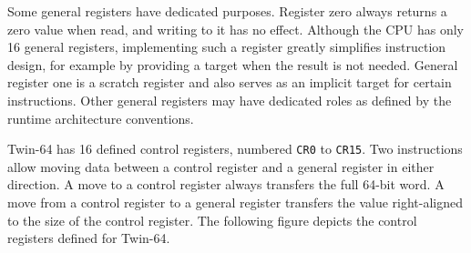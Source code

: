 Some general registers have dedicated purposes. Register zero always returns a zero value when read, and writing to it has no effect. Although the CPU has only 16 general registers, implementing such a register greatly simplifies instruction design, for example by providing a target when the result is not needed. General register one is a scratch register and also serves as an implicit target for certain instructions. Other general registers may have dedicated roles as defined by the runtime architecture conventions.


Twin-64 has 16 defined control registers, numbered \texttt{CR0} to \texttt{CR15}. Two instructions allow moving data between a control register and a general register in either direction. A move to a control register always transfers the full 64-bit word. A move from a control register to a general register transfers the value right-aligned to the size of the control register. The following figure depicts the control registers defined for Twin-64.

